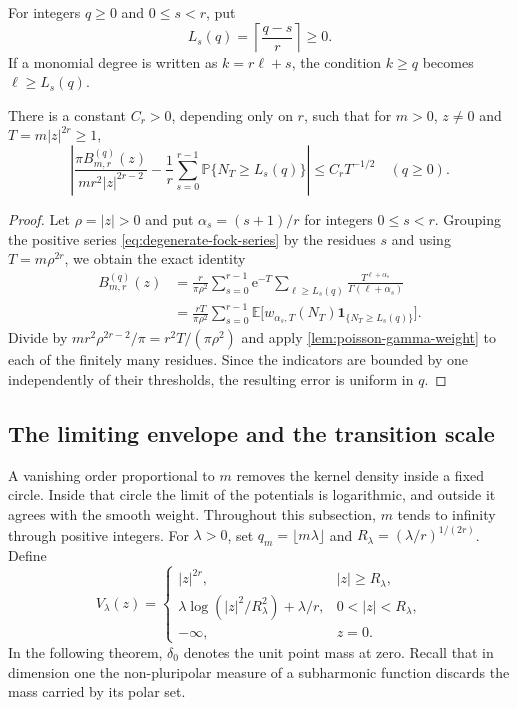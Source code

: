 For integers $q\geq0$ and $0\leq s<r$, put
\[
 L_s(q)=\left\lceil\frac{q-s}{r}\right\rceil\geq0.
\]
If a monomial degree is written as $k=r\ell+s$, the condition $k\geq q$ becomes $\ell\geq L_s(q)$.

\begin{proposition}\label{prop:degenerate-kernel-poisson}
There is a constant $C_r>0$, depending only on $r$, such that for $m>0$, $z\ne0$ and $T=m|z|^{2r}\geq1$,
\begin{equation}\label{eq:degenerate-poisson-comparison}
 \left|\frac{\pi B_{m,r}^{(q)}(z)}{mr^2|z|^{2r-2}}
 -\frac1r\sum_{s=0}^{r-1}\mathbb P\{N_T\geq L_s(q)\}\right|
 \leq C_r T^{-1/2}
 \quad(q\geq0).
\end{equation}
\end{proposition}
\begin{proof}
Let $\rho=|z|>0$ and put $\alpha_s=(s+1)/r$ for integers $0\leq s<r$. Grouping the positive series \eqref{eq:degenerate-fock-series} by the residues $s$ and using $T=m\rho^{2r}$, we obtain the exact identity
\[
 \begin{split}
 B_{m,r}^{(q)}(z)
 &=\frac r{\pi\rho^2}\sum_{s=0}^{r-1}
     \mathrm{e}^{-T}\sum_{\ell\geq L_s(q)}
           \frac{T^{\ell+\alpha_s}}{\Gamma(\ell+\alpha_s)}\\
 &=\frac{rT}{\pi\rho^2}\sum_{s=0}^{r-1}
     \mathbb E\bigl[w_{\alpha_s,T}(N_T)
                         \mathbf1_{\{N_T\geq L_s(q)\}}\bigr].
 \end{split}
\]
Divide by $mr^2\rho^{2r-2}/\pi=r^2T/(\pi\rho^2)$ and apply \cref{lem:poisson-gamma-weight} to each of the finitely many residues. Since the indicators are bounded by one independently of their thresholds, the resulting error is uniform in $q$.
\end{proof}

\enlargethispage{2\baselineskip}
\subsection{The limiting envelope and the transition scale}
\label{sec:degenerate-kernel-limit}

A vanishing order proportional to $m$ removes the kernel density inside a fixed circle. Inside that circle the limit of the potentials is logarithmic, and outside it agrees with the smooth weight. Throughout this subsection, $m$ tends to infinity through positive integers. For $\lambda>0$, set $q_m=\lfloor m\lambda\rfloor$ and $R_\lambda=(\lambda/r)^{1/(2r)}$. Define
\[
 V_\lambda(z)=
 \begin{cases}
 |z|^{2r},&|z|\geq R_\lambda,\\
 \lambda\log(|z|^2/R_\lambda^2)+\lambda/r,&0<|z|<R_\lambda,\\
 -\infty,&z=0.
 \end{cases}
\]
In the following theorem, $\delta_0$ denotes the unit point mass at zero. Recall that in dimension one the non-pluripolar measure of a subharmonic function discards the mass carried by its polar set.

